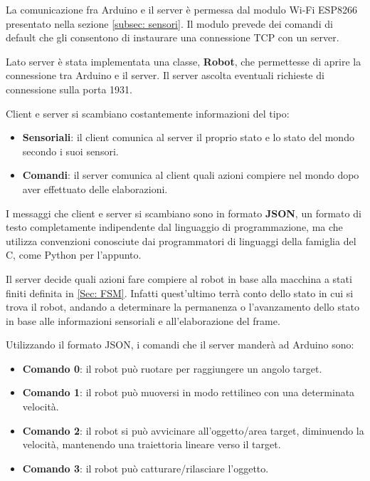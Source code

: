 \documentclass[a4paper,12pt,italian]{article}
\begin{document}
La comunicazione fra Arduino e il server è permessa dal modulo Wi-Fi ESP8266 presentato nella sezione \ref{subsec: sensori}. Il modulo prevede dei comandi di default che gli consentono di instaurare una connessione TCP con un server. 

Lato server è stata implementata una classe, \textbf{Robot}, che permettesse di aprire la connessione tra Arduino e il server. Il server ascolta eventuali richieste di connessione sulla porta 1931.

Client e server si scambiano costantemente informazioni del tipo:
\begin{itemize}
	\item \textbf{Sensoriali}: il client comunica al server il proprio stato e lo stato del mondo secondo i suoi sensori.
	\item \textbf{Comandi}: il server comunica al client quali azioni compiere nel mondo dopo aver effettuato delle elaborazioni.
\end{itemize}

I messaggi che client e server si scambiano sono in formato \textbf{JSON}, un formato di testo completamente indipendente dal linguaggio di programmazione, ma che utilizza convenzioni conosciute dai programmatori di linguaggi della famiglia del C, come Python per l'appunto.

Il server decide quali azioni fare compiere al robot in base alla macchina a stati finiti definita in \ref{Sec: FSM}. Infatti quest'ultimo terrà conto dello stato in cui si trova il robot, andando a determinare la permanenza o l'avanzamento dello stato in base alle informazioni sensoriali e all'elaborazione del frame.

Utilizzando il formato JSON, i comandi che il server manderà ad Arduino sono:
\begin{itemize}
	\item \textbf{Comando 0}: il robot può ruotare per raggiungere un angolo target.
	\item \textbf{Comando 1}: il robot può muoversi in modo rettilineo con una determinata velocità.
	\item \textbf{Comando 2}: il robot si può avvicinare all'oggetto/area target, diminuendo la velocità, mantenendo una traiettoria lineare verso il target.
	\item \textbf{Comando 3}: il robot può catturare/rilasciare l'oggetto.
\end{itemize}
\end{document}
